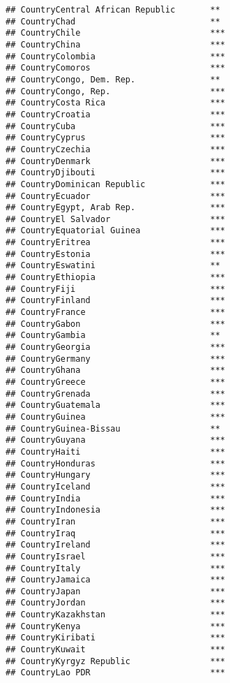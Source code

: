 \documentclass[
]{article}
\begin{document}
\begin{verbatim}
## CountryCentral African Republic       ** 
## CountryChad                           ** 
## CountryChile                          ***
## CountryChina                          ***
## CountryColombia                       ***
## CountryComoros                        ***
## CountryCongo, Dem. Rep.               ** 
## CountryCongo, Rep.                    ***
## CountryCosta Rica                     ***
## CountryCroatia                        ***
## CountryCuba                           ***
## CountryCyprus                         ***
## CountryCzechia                        ***
## CountryDenmark                        ***
## CountryDjibouti                       ***
## CountryDominican Republic             ***
## CountryEcuador                        ***
## CountryEgypt, Arab Rep.               ***
## CountryEl Salvador                    ***
## CountryEquatorial Guinea              ***
## CountryEritrea                        ***
## CountryEstonia                        ***
## CountryEswatini                       ** 
## CountryEthiopia                       ***
## CountryFiji                           ***
## CountryFinland                        ***
## CountryFrance                         ***
## CountryGabon                          ***
## CountryGambia                         ** 
## CountryGeorgia                        ***
## CountryGermany                        ***
## CountryGhana                          ***
## CountryGreece                         ***
## CountryGrenada                        ***
## CountryGuatemala                      ***
## CountryGuinea                         ***
## CountryGuinea-Bissau                  ** 
## CountryGuyana                         ***
## CountryHaiti                          ***
## CountryHonduras                       ***
## CountryHungary                        ***
## CountryIceland                        ***
## CountryIndia                          ***
## CountryIndonesia                      ***
## CountryIran                           ***
## CountryIraq                           ***
## CountryIreland                        ***
## CountryIsrael                         ***
## CountryItaly                          ***
## CountryJamaica                        ***
## CountryJapan                          ***
## CountryJordan                         ***
## CountryKazakhstan                     ***
## CountryKenya                          ***
## CountryKiribati                       ***
## CountryKuwait                         ***
## CountryKyrgyz Republic                ***
## CountryLao PDR                        ***

\end{verbatim}
\end{document}
